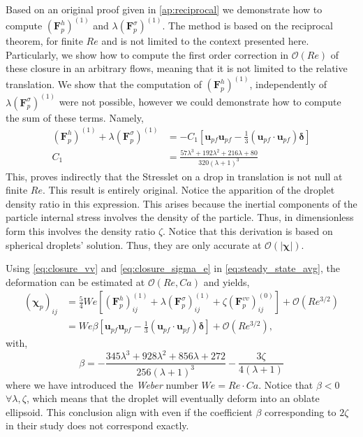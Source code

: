 Based on an original proof given in \ref{ap:reciprocal} we demonstrate how to compute $(\textbf{F}^h_p)^{(1)}$ and $\lambda (\textbf{F}^\sigma_p)^{(1)}$. 
The method is based on the reciprocal theorem, for finite $Re$ and is not limited to the context presented here.
Particularly, we show how to compute the first order correction in $\mathcal{O}(Re)$ of these closure in an arbitrary flows, meaning that it is not limited to the relative translation.
We show that the computation of $(\textbf{F}^h_p)^{(1)}$, independently of $\lambda (\textbf{F}^\sigma_p)^{(1)}$ were not possible, however we could demonstrate  how to compute the sum of these terms. 
Namely, 
\begin{align}
    (\textbf{F}^h_p)^{(1)}  
    + \lambda (\textbf{F}^\sigma_p)^{(1)}
    &=
    - C_1
    [
        \textbf{u}_{pf}\textbf{u}_{pf} - \frac{1}{3}(\textbf{u}_{pf}\cdot \textbf{u}_{pf})\bm\delta 
    ]\\
    C_1 &=
    \frac{57 \lambda^{3} + 192 \lambda^{2} + 216 \lambda + 80}{320 \left(\lambda + 1\right)^{3}}
    \label{eq:closure_sigma_e}
\end{align}
This, proves indirectly that the Stresslet on a drop in translation is not null at finite $Re$. 
This result is entirely original. 
Notice the apparition of the droplet density ratio in this expression. 
This arises because the inertial components of the particle internal stress involves the density of the particle. 
Thus, in dimensionless form this involves the density ratio $\zeta$.
Notice that this derivation is based on spherical droplets' solution. 
Thus, they are only accurate at $\mathcal{O}(|\bm\chi|)$. 


Using \ref{eq:closure_vv} and \ref{eq:closure_sigma_e} in  \ref{eq:steady_state_avg}, the deformation can be estimated at $\mathcal{O}(Re,Ca)$ and yields, 
\begin{align*}
    (\bm\chi_{p})_{ij}
    &= 
    \frac{5}{4}We \left[
        (\textbf{F}_p^h )_{ij}^{(1)}
        + \lambda (\textbf{F}_p^{\sigma})_{ij}^{(1)}
        + \zeta (\textbf{F}_p^{vv})_{ij}^{(0)}
    \right]
    + \mathcal{O}(Re^{3/2})\\
    &= We \beta [\textbf{u}_{pf}\textbf{u}_{pf} - \frac{1}{3}(\textbf{u}_{pf}\cdot \textbf{u}_{pf})\bm\delta ]
    + \mathcal{O}(Re^{3/2}),
\end{align*}
with, 
\begin{equation*}
    \beta = 
    - \frac{345 \lambda^{3} + 928 \lambda^{2} + 856 \lambda + 272}{256 \left(\lambda + 1\right)^{3}}
    - \frac{3 \zeta}{4 \left(\lambda + 1\right)} 
\end{equation*}
where we have introduced the \textit{Weber} number $We = Re \cdot Ca$. 
Notice that $\beta < 0$ $\forall \lambda,\zeta$, which means that the droplet will eventually deform into an oblate ellipsoid.
This conclusion align with \citet{taylor1964deformation} even if the coefficient $\beta$ corresponding to $2\zeta$ in their  study does not correspond exactly.   

